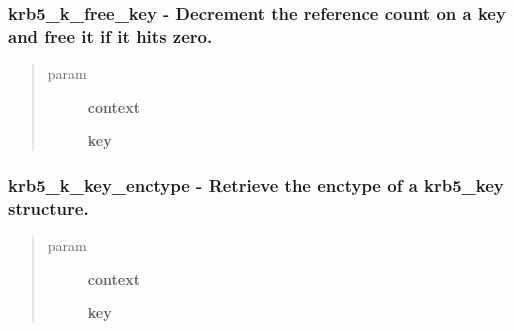 \documentclass[letterpaper,10pt,english]{sphinxmanual}
\begin{document}
\subsubsection{krb5\_k\_free\_key -  Decrement the reference count on a key and free it if it hits zero.}
\label{appdev/refs/api/krb5_k_free_key:krb5-k-free-key-decrement-the-reference-count-on-a-key-and-free-it-if-it-hits-zero}\label{appdev/refs/api/krb5_k_free_key::doc}

\begin{fulllineitems}
\label{appdev/refs/api/krb5_k_free_key:c.krb5_k_free_key}
\end{fulllineitems}

\begin{quote}\begin{description}
\item[{param}] \leavevmode
\textbf{context}

\textbf{key}

\end{description}\end{quote}


\subsubsection{krb5\_k\_key\_enctype -  Retrieve the enctype of a krb5\_key structure.}
\label{appdev/refs/api/krb5_k_key_enctype::doc}\label{appdev/refs/api/krb5_k_key_enctype:krb5-k-key-enctype-retrieve-the-enctype-of-a-krb5-key-structure}

\begin{fulllineitems}
\label{appdev/refs/api/krb5_k_key_enctype:c.krb5_k_key_enctype}
\end{fulllineitems}

\begin{quote}\begin{description}
\item[{param}] \leavevmode
\textbf{context}

\textbf{key}

\end{description}\end{quote}
\end{document}
